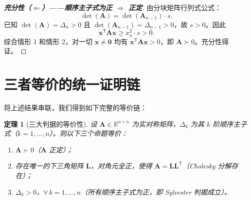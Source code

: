 \documentclass[12pt,a4paper]{article}
\theoremstyle{mystyle}
\newtheorem{theorem}{定理}[section]
\theoremstyle{proofstyle}
\newtheorem*{proof}{证明}
\theoremstyle{definition}
\theoremstyle{remark}
\newcommand{\R}{\mathbb{R}}
\newcommand{\T}{^{\mathsf{T}}}
\newcommand{\x}{\mathbf{x}}
\newcommand{\A}{\mathbf{A}}
\newcommand{\Lmat}{\mathbf{L}}
\newcommand{\zero}{\mathbf{0}}
\begin{document}
\begin{proof}[\textbf{充分性（$\Longleftarrow$）——顺序主子式为正 $\Rightarrow$ 正定}]
由分块矩阵行列式公式：
\[
    \det(\A) = \det(\A_{n-1}) \cdot s.
\]
已知 $\det(\A) = \Delta_n > 0$ 且 $\det(\A_{n-1}) = \Delta_{n-1} > 0$，故 $s > 0$。因此
\[
    \x\T\A\x \ge x_n^2 \cdot s > 0.
\]
综合情形 1 和情形 2，对一切 $\x \neq \zero$ 均有 $\x\T\A\x > 0$，即 $\A \succ 0$。充分性得证。
\end{proof}

\section{三者等价的统一证明链}

将上述结果串联，我们得到如下完整的等价链：

\begin{theorem}[三大判据的等价性]\label{thm:equivalence}
设 $\A \in \R^{n\times n}$ 为实对称矩阵，$\Delta_k$ 为其 $k$ 阶顺序主子式（$k=1,\dots,n$）。则以下三个命题等价：
\begin{enumerate}
    \item[(I)] $\A \succ 0$（$\A$ 正定）；
    \item[(II)] 存在唯一的下三角矩阵 $\Lmat$，对角元全正，使得 $\A = \Lmat\Lmat\T$（Cholesky 分解存在）；
    \item[(III)] $\Delta_k > 0$，$\forall\,k = 1,\dots,n$（所有顺序主子式为正，即 Sylvester 判据成立）。
\end{enumerate}
\end{theorem}
\end{document}

